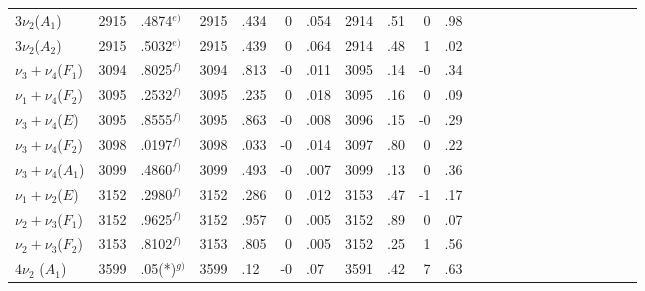 \begin{table}[p]
{{\begin{tabular}{l|r@{}lr@{}lr@{}lr@{}lr@{}l|r@{}lr@{}lr@{}l|r@{}lr@{}lr@{}l}
$3\nu_2$($A_1$)       & 2915&.4874$^{e)}$  & 2915&.434 & 0&.054 & 2914&.51 & 0&.98 &     &             &     &     &  &     &     &             &     &     &  &     \\
$3\nu_2$($A_2$)       & 2915&.5032$^{e)}$  & 2915&.439 & 0&.064 & 2914&.48 & 1&.02 &     &             &     &     &  &     &     &             &     &     &  &     \\
$\nu_3+ \nu_4$($F_1$) & 3094&.8025$^{f)}$  & 3094&.813 &-0&.011 & 3095&.14 &-0&.34 &     &             &     &     &  &     &     &             &     &     &  &     \\
$\nu_1+ \nu_4$($F_2$) & 3095&.2532$^{f)}$  & 3095&.235 & 0&.018 & 3095&.16 & 0&.09 &     &             &     &     &  &     &     &             &     &     &  &     \\
$\nu_3+ \nu_4$($E  $) & 3095&.8555$^{f)}$  & 3095&.863 &-0&.008 & 3096&.15 &-0&.29 &     &             &     &     &  &     &     &             &     &     &  &     \\
$\nu_3+ \nu_4$($F_2$) & 3098&.0197$^{f)}$  & 3098&.033 &-0&.014 & 3097&.80 & 0&.22 &     &             &     &     &  &     &     &             &     &     &  &     \\
$\nu_3+ \nu_4$($A_1$) & 3099&.4860$^{f)}$  & 3099&.493 &-0&.007 & 3099&.13 & 0&.36 &     &             &     &     &  &     &     &             &     &     &  &     \\
$\nu_1+ \nu_2$($E  $) & 3152&.2980$^{f)}$  & 3152&.286 & 0&.012 & 3153&.47 &-1&.17 &     &             &     &     &  &     &     &             &     &     &  &     \\
$\nu_2+ \nu_3$($F_1$) & 3152&.9625$^{f)}$  & 3152&.957 & 0&.005 & 3152&.89 & 0&.07 &     &             &     &     &  &     &     &             &     &     &  &     \\
$\nu_2+ \nu_3$($F_2$) & 3153&.8102$^{f)}$  & 3153&.805 & 0&.005 & 3152&.25 & 1&.56 &     &             &     &     &  &     &     &             &     &     &  &     \\
$4\nu_2      $ ($A_1$)& 3599&.05(*)$^{g)}$ & 3599&.12  &-0&.07  & 3591&.42 & 7&.63 &     &             &     &     &  &     &     &             &     &     &  &     \\
\hline\hline
\end{tabular}
}%
}
\endgroup
\end{table}
